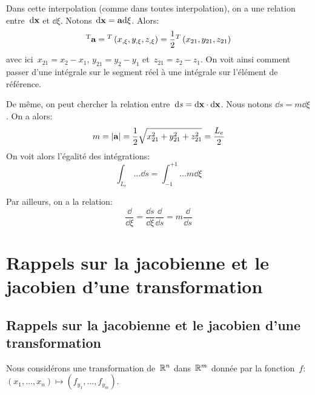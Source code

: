\medskipvm\fi
Dans cette interpolation (comme dans toutes interpolation), on a une relation entre~$\dd\VV{x}$ et
$ \dd \xi$. Notons~$\dd\VV{x} = \VV{a} \dd \xi$. Alors:
\begin{equation} {}^\mathrm{T}\mathbf{a} = {}^T\left( x_{,\xi}, y_{,\xi}, z_{,\xi}\right) = \frac12 {}^T\left( x_{21}, y_{21}, z_{21}\right)\end{equation}
avec ici~$x_{21}=x_2-x_1$, $y_{21}=y_2-y_1$ et~$z_{21}=z_2-z_1$.
On voit ainsi comment passer d'une intégrale sur le segment réel à une intégrale
sur l'élément de référence.

\medskipvm
De même, on peut chercher la relation entre~$\dd s=\dd\VV{x}\cdot\dd\VV{x}$. Nous notons
$\dd s=m \dd \xi$. On a alors: 
\begin{equation}m=|\VV{a}| = \frac12 \sqrt{x_{21}^2+y_{21}^2+z_{21}^2} = \frac{L_e}2 \end{equation}
On voit alors l'égalité des intégrations:
\begin{equation}\int_{L_e} \ldots \dd s = \int_{-1}^{+1}\ldots m \dd \xi\end{equation}

\medskipvm
Par ailleurs, on a la relation:
\begin{equation} \frac{\dd}{ \dd \xi} = \frac{\dd s}{ \dd \xi}\frac{\dd}{\dd s}=m\frac{\dd}{\dd s}\end{equation}
\medskipvm
\ifVersionAvecExemplesSepares
  \section{Rappels sur la jacobienne et le jacobien d'une transformation}
\else
  \subsection{Rappels sur la jacobienne et le jacobien d'une transformation}
\fi

Nous considérons une transformation de~$\mathbb R^n$ dans~$\mathbb R^m$ donnée par la fonction~$f$: 
$\left(x_1, \ldots, x_n \right) \mapsto \left(f_{y_1}, \ldots, f_{y_m} \right)$.
\ifVersionDuDocEstVincent

